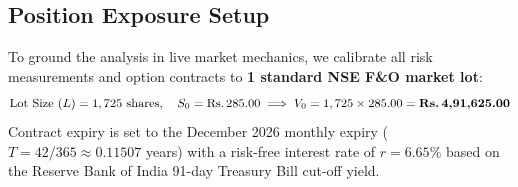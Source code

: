 \subsection{Position Exposure Setup}
To ground the analysis in live market mechanics, we calibrate all risk measurements and option contracts to \textbf{1 standard NSE F\&O market lot}:
\begin{equation}
\text{Lot Size } (L) = 1,725 \text{ shares}, \quad S_0 = \text{\text{Rs.}\,}285.00 \implies V_0 = 1,725 \times 285.00 = \text{\textbf{\text{Rs.}\,4,91,625.00}}
\end{equation}
Contract expiry is set to the December 2026 monthly expiry ($T = 42/365 \approx 0.11507$ years) with a risk-free interest rate of $r = 6.65\%$ based on the Reserve Bank of India 91-day Treasury Bill cut-off yield.
